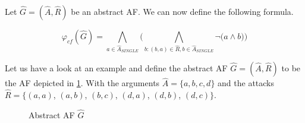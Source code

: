 \begin{definition}
    Let $\hat{G}=(\hat{A},\hat{R})$ be an abstract AF. We can now define the following formula.
    \begin{center}
        \[ \varphi_{cf}(\hat{G}) =
        \bigwedge_{a \in \hat{A}_{\!S\!I\!N\!G\!L\!E}} \bigl( \bigwedge_{b:(b,a)\in \hat{R}, b \in \hat{A}_{\!S\!I\!N\!G\!L\!E}} \lnot \bigl( a \wedge b \bigl) \bigl)
        \]
    \end{center}
    \label{def:booleanFormulaConflictFree}
\end{definition}


\begin{example}
    Let us have a look at an example and define the abstract AF $\hat{G} = (\hat{A}, \hat{R})$ to be the AF depicted in \cref{af:algorithmEncodingsConflictFree}. With the arguments $\hat{A}=\{a, b, c, d\}$ and the attacks $\hat{R}=\big\{ (a,a)$, $(a,b)$, $(b,c)$, $(d,a)$, $(d,b)$, $(d,c)\big\}$.

    \begin{figure}[H]
        \centering
        \caption{Abstract AF $\hat{G}$}
        \label{af:algorithmEncodingsConflictFree}
    \end{figure}


\end{example}
